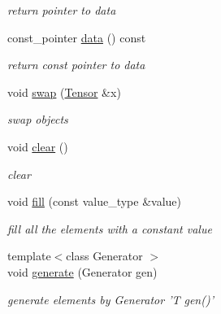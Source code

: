 \begin{DoxyCompactItemize}
\begin{DoxyCompactList}\small\item\em return pointer to data \item\end{DoxyCompactList}\item 
\hypertarget{classbtas_1_1_tensor_abc551d05b2abecebb19b0b7b7e0f2c38}{
const\_\-pointer \hyperlink{classbtas_1_1_tensor_abc551d05b2abecebb19b0b7b7e0f2c38}{data} () const }
\label{classbtas_1_1_tensor_abc551d05b2abecebb19b0b7b7e0f2c38}

\begin{DoxyCompactList}\small\item\em return const pointer to data \item\end{DoxyCompactList}\item 
\hypertarget{classbtas_1_1_tensor_a3f3361e8a3586a33ac57b1f7830260d7}{
void \hyperlink{classbtas_1_1_tensor_a3f3361e8a3586a33ac57b1f7830260d7}{swap} (\hyperlink{classbtas_1_1_tensor}{Tensor} \&x)}
\label{classbtas_1_1_tensor_a3f3361e8a3586a33ac57b1f7830260d7}

\begin{DoxyCompactList}\small\item\em swap objects \item\end{DoxyCompactList}\item 
\hypertarget{classbtas_1_1_tensor_ac4f95ac4546e6fbf98dbb50208499e33}{
void \hyperlink{classbtas_1_1_tensor_ac4f95ac4546e6fbf98dbb50208499e33}{clear} ()}
\label{classbtas_1_1_tensor_ac4f95ac4546e6fbf98dbb50208499e33}

\begin{DoxyCompactList}\small\item\em clear \item\end{DoxyCompactList}\item 
\hypertarget{classbtas_1_1_tensor_a467dd38e5b53b8f02311ca4429ba72fd}{
void \hyperlink{classbtas_1_1_tensor_a467dd38e5b53b8f02311ca4429ba72fd}{fill} (const value\_\-type \&value)}
\label{classbtas_1_1_tensor_a467dd38e5b53b8f02311ca4429ba72fd}

\begin{DoxyCompactList}\small\item\em fill all the elements with a constant value \item\end{DoxyCompactList}\item 
\hypertarget{classbtas_1_1_tensor_ae7ca1d2cb1784782c186a0672d0ac066}{
{\footnotesize template$<$class Generator $>$ }\\void \hyperlink{classbtas_1_1_tensor_ae7ca1d2cb1784782c186a0672d0ac066}{generate} (Generator gen)}
\label{classbtas_1_1_tensor_ae7ca1d2cb1784782c186a0672d0ac066}

\begin{DoxyCompactList}\small\item\em generate elements by Generator 'T gen()' \item\end{DoxyCompactList}\end{DoxyCompactItemize}

